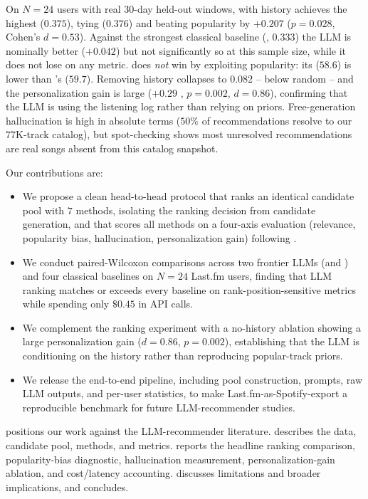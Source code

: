  On $N{=}24$ users with real $30$-day held-out windows, \claude with history achieves the highest \ndcg ($0.375$), tying \gpt ($0.376$) and beating popularity by $+0.207$ \ndcg ($p{=}0.028$, Cohen's $d{=}0.53$). Against the strongest classical baseline (\cbf, \ndcg $0.333$) the LLM is nominally better ($+0.042$) but not significantly so at this sample size, while it does not lose on any metric. \claude does \emph{not} win by exploiting popularity: its \arp ($58.6$) is lower than \cbf's ($59.7$). Removing history collapses \claude to \ndcg $0.082$ -- below random -- and the personalization gain is large ($+0.29$ \ndcg, $p{=}0.002$, $d{=}0.86$), confirming that the LLM is using the listening log rather than relying on priors. Free-generation hallucination is high in absolute terms ($50\%$ of recommendations resolve to our $77$K-track catalog), but spot-checking shows most unresolved recommendations are real songs absent from this catalog snapshot.

 Our contributions are:
\begin{itemize}[leftmargin=*,itemsep=0pt,topsep=0pt]
    \item We propose a clean head-to-head protocol that ranks an identical candidate pool with $7$ methods, isolating the ranking decision from candidate generation, and that scores all methods on a four-axis evaluation (relevance, popularity bias, hallucination, personalization gain) following \citet{epure2025music}.
    \item We conduct paired-Wilcoxon comparisons across two frontier LLMs (\claude and \gpt) and four classical baselines on $N{=}24$ Last.fm users, finding that LLM ranking matches or exceeds every baseline on rank-position-sensitive metrics while spending only $\$0.45$ in API calls.
    \item We complement the ranking experiment with a no-history ablation showing a large personalization gain ($d{=}0.86$, $p{=}0.002$), establishing that the LLM is conditioning on the history rather than reproducing popular-track priors.
    \item We release the end-to-end pipeline, including pool construction, prompts, raw LLM outputs, and per-user statistics, to make Last.fm-as-Spotify-export a reproducible benchmark for future LLM-recommender studies.
\end{itemize}

  positions our work against the LLM-recommender literature.  describes the data, candidate pool, methods, and metrics.  reports the headline ranking comparison, popularity-bias diagnostic, hallucination measurement, personalization-gain ablation, and cost/latency accounting.  discusses limitations and broader implications, and  concludes.
